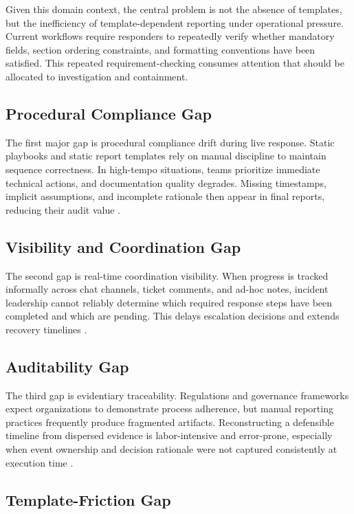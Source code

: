 Given this domain context, the central problem is not the absence of templates, but the inefficiency of template-dependent reporting under operational pressure. Current workflows require responders to repeatedly verify whether mandatory fields, section ordering constraints, and formatting conventions have been satisfied. This repeated requirement-checking consumes attention that should be allocated to investigation and containment.

\subsection{Procedural Compliance Gap}

The first major gap is procedural compliance drift during live response. Static playbooks and static report templates rely on manual discipline to maintain sequence correctness. In high-tempo situations, teams prioritize immediate technical actions, and documentation quality degrades. Missing timestamps, implicit assumptions, and incomplete rationale then appear in final reports, reducing their audit value \cite{journal_cybersecurity_stress,isaca_survey_2021}.

\subsection{Visibility and Coordination Gap}

The second gap is real-time coordination visibility. When progress is tracked informally across chat channels, ticket comments, and ad-hoc notes, incident leadership cannot reliably determine which required response steps have been completed and which are pending. This delays escalation decisions and extends recovery timelines \cite{ibm_breach_2023}.

\subsection{Auditability Gap}

The third gap is evidentiary traceability. Regulations and governance frameworks expect organizations to demonstrate process adherence, but manual reporting practices frequently produce fragmented artifacts. Reconstructing a defensible timeline from dispersed evidence is labor-intensive and error-prone, especially when event ownership and decision rationale were not captured consistently at execution time \cite{gdpr,nis2,sox,hipaa}.

\subsection{Template-Friction Gap}


